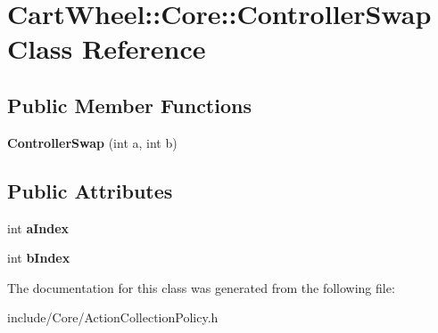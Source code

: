 \hypertarget{classCartWheel_1_1Core_1_1ControllerSwap}{
\section{CartWheel::Core::ControllerSwap Class Reference}
\label{classCartWheel_1_1Core_1_1ControllerSwap}
}
\subsection*{Public Member Functions}
\begin{DoxyCompactItemize}
\item 
\hypertarget{classCartWheel_1_1Core_1_1ControllerSwap_ab04a8f3f5b6a41f3bd1ce33636f42a98}{
{\bfseries ControllerSwap} (int a, int b)}
\label{classCartWheel_1_1Core_1_1ControllerSwap_ab04a8f3f5b6a41f3bd1ce33636f42a98}

\end{DoxyCompactItemize}
\subsection*{Public Attributes}
\begin{DoxyCompactItemize}
\item 
\hypertarget{classCartWheel_1_1Core_1_1ControllerSwap_a3183b5f62fd397b6cc4de1378bb50247}{
int {\bfseries aIndex}}
\label{classCartWheel_1_1Core_1_1ControllerSwap_a3183b5f62fd397b6cc4de1378bb50247}

\item 
\hypertarget{classCartWheel_1_1Core_1_1ControllerSwap_a741f8e68f854bf6349981dbba3f0a6fd}{
int {\bfseries bIndex}}
\label{classCartWheel_1_1Core_1_1ControllerSwap_a741f8e68f854bf6349981dbba3f0a6fd}

\end{DoxyCompactItemize}


The documentation for this class was generated from the following file:\begin{DoxyCompactItemize}
\item 
include/Core/ActionCollectionPolicy.h\end{DoxyCompactItemize}
